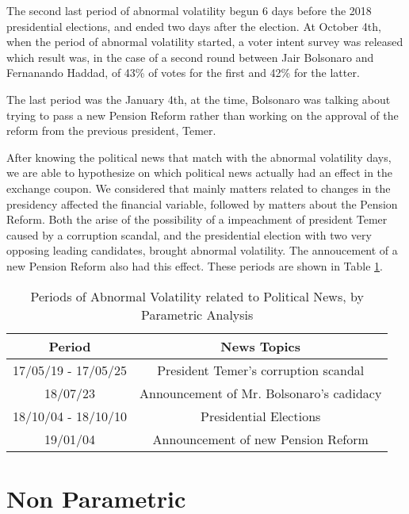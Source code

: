 \documentclass[cic,tc, english]{iiufrgs}
\begin{document}
    The second last period of abnormal volatility begun 6 days before the 2018 presidential elections, and ended two days after the election. At October 4th, when the period of abnormal volatility started, a voter intent survey was released which result was, in the case of a second round between Jair Bolsonaro and Fernanando Haddad, of 43\% of votes for the first and 42\% for the latter.

    The last period was the January 4th, at the time, Bolsonaro was talking about trying to pass a new Pension Reform rather than working on the approval of the reform from the previous president, Temer.

    After knowing the political news that match with the abnormal volatility days, we are able to hypothesize on which political news actually had an effect in the exchange coupon. We considered that mainly matters related to changes in the presidency affected the financial variable, followed by matters about the Pension Reform. Both the arise of the possibility of a impeachment of president Temer caused by a corruption scandal, and the presidential election with two very opposing leading candidates, brought abnormal volatility. The annoucement of a new Pension Reform also had this effect. These periods are shown in Table \ref{tab:respar}.

    \begin{table}[H]
        \caption{Periods of Abnormal Volatility related to Political News, by Parametric Analysis}
        \label{tab:respar}
        \centering
        \begin{tabular}{| c | c |}
            \hline
            Period & News Topics \\
            \hline \hline
            17/05/19 - 17/05/25 & President Temer's corruption scandal \\
            \hline
            18/07/23 & Announcement of Mr. Bolsonaro's cadidacy \\
            \hline
            18/10/04 - 18/10/10 & Presidential Elections \\
            \hline
            19/01/04 & Announcement of new Pension Reform \\
            \hline
        \end{tabular}
    \end{table}

\section{Non Parametric}
\end{document}
